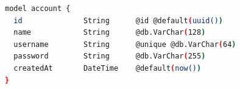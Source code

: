 \begin{minipage}{\textwidth}
\begin{lstlisting}[language=bash, caption={Implementasi Tabel Akun pada \texttt{schema.prisma}}, label={lst:prisma_account}, frame=single, captionpos=t]
model account {
  id              String      @id @default(uuid())
  name            String      @db.VarChar(128)
  username        String      @unique @db.VarChar(64)
  password        String      @db.VarChar(255)
  createdAt       DateTime    @default(now())
}
\end{lstlisting}
\end{minipage}